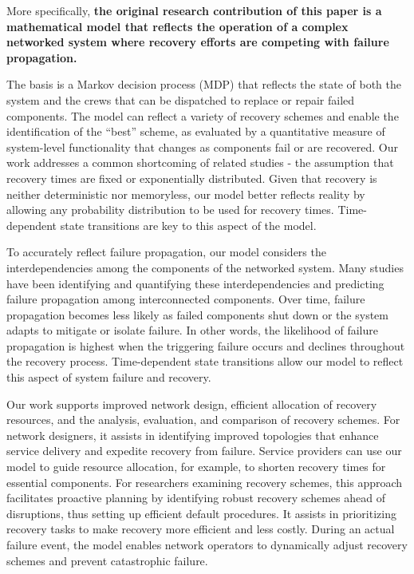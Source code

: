 \documentclass[conference]{IEEEtran}
\begin{document}
More specifically, \textbf{the original research contribution of this paper is a mathematical model that reflects the operation of a complex networked system where recovery efforts are competing with failure propagation.} 

The basis is a Markov decision process (MDP) that reflects the state of both the system and the crews that can be dispatched to replace or repair failed components. The model can reflect a variety of recovery schemes and enable the identification of the ``best'' scheme, as evaluated by a quantitative measure of system-level functionality that changes as components fail or are recovered. Our work addresses a common shortcoming of related studies - the assumption that recovery times are fixed or exponentially distributed. Given that recovery is neither deterministic nor memoryless, our model better reflects reality by allowing any probability distribution to be used for recovery times. Time-dependent state transitions are key to this aspect of the model. 

To accurately reflect failure propagation, our model considers the interdependencies among the components of the networked system. Many studies have been identifying and quantifying these interdependencies and predicting failure propagation among interconnected components. Over time, failure propagation becomes less likely as failed components shut down or the system adapts to mitigate or isolate failure. In other words, the likelihood of failure propagation is highest when the triggering failure occurs and declines throughout the recovery process. Time-dependent state transitions allow our model to reflect this aspect of system failure and recovery. 

Our work supports improved network design, efficient allocation of recovery resources, and the analysis, evaluation, and comparison of recovery schemes. 
For network designers, it assists in identifying improved topologies that enhance service delivery and expedite recovery from failure. Service providers can use our model to guide resource allocation, for example, to shorten recovery times for essential components. 
For researchers examining recovery schemes, this approach facilitates proactive planning by identifying robust recovery schemes ahead of disruptions, thus setting up efficient default procedures. It assists in prioritizing recovery tasks to make recovery more efficient and less costly. During an actual failure event, the model enables network operators to dynamically adjust recovery schemes and prevent catastrophic failure.
\end{document}

